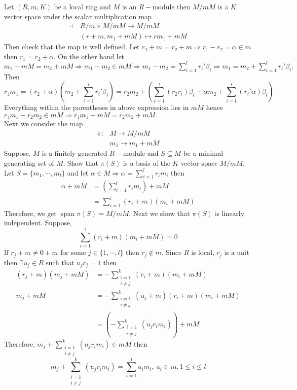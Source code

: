\documentclass[11pt]{amsart}
\begin{document}
Let $(R,m,K)$ be a local ring and $M$ is an $R-$module then $M/mM$ is a $K$ vector space under the scalar multiplication map \begin{align*}
\cdot:&R/m\times M/mM \to M/mM\\
&(r+m,m_1+mM)\mapsto rm_1+mM
\end{align*}
Then check that the map is well defined. Let $r_1+m=r_2+m \Rightarrow r_1-r_2=\alpha \in m$ then $r_1=r_2+\alpha.$ On the other hand let $m_1+mM=m_2+mM \Rightarrow m_1-m_2\in mM \Rightarrow m_1-m_2=\displaystyle\sum_{i=1}^l r_i'\beta_i \Rightarrow m_1=m_2+\displaystyle\sum_{i=1}^l r_i'\beta_i.$ Then $$r_1m_1=(r_2+\alpha)(m_2+\displaystyle\sum_{i=1}^l r_i'\beta_i)=r_2m_2+\left( \displaystyle\sum_{i=1}^l (r_2r_i)\beta_i+\alpha m_2+\displaystyle\sum_{i=1}^l (r_i'\alpha)\beta_i \right)$$ Everything within the parentheses in above expression lies in $mM$ hence $r_1m_1-r_2m_2\in mM \Rightarrow r_1m_1+mM=r_2m_2+mM.$\\
Next we consider the map \begin{align*}
\pi:&M\to M/mM\\
&m_1\to m_1+mM
\end{align*}
Suppose, $M$ is a finitely generated $R-$module and $S\subseteq M$ be a minimal generating set of $M.$ Show that $\pi(S)$ is a basis of the $K$ vector space $M/mM.$ Let $S=\{m_1,\cdots ,m_l\}$ and let $\alpha\in M \Rightarrow \alpha=\displaystyle\sum_{i=1}^l r_im_i$ then \begin{align*}
\alpha+mM&=\left(\displaystyle\sum_{i=1}^l r_im_i \right) +mM\\
&=\displaystyle\sum_{i=1}^l (r_i+m)(m_i+mM)
\end{align*}
Therefore, we get $\operatorname{span}\pi(S)=M/mM.$ Next we show that $\pi(S)$ is linearly independent. Suppose, $$\displaystyle\sum_{i=1}^l (r_i+m)(m_i+mM)=0$$ If $r_j+m\neq 0+m$ for some $j\in \{1,\cdots, l\}$ then $r_j\notin m.$ Since $R$ is local, $r_j$ is a unit then $\exists u_j\in R$ such that $u_jr_j=1$ then \begin{align*}
(r_j+m)(m_j+mM)&=-\displaystyle\sum_{\substack{i=1\\ i\neq j}}^k (r_i+m)(m_i+mM)\\
m_j+mM&=-\displaystyle\sum_{\substack{i=1\\ i\neq j}}^k (u_j+m)(r_i+m)(m_i+mM)\\
&=\left(-\displaystyle\sum_{\substack{i=1\\ i\neq j}}^k (u_jr_im_i)\right)+mM
\end{align*}
Therefore, $m_j+\displaystyle\sum_{\substack{i=1\\ i\neq j}}^k (u_jr_im_i)\in mM$ then \begin{equation} 
 m_j+\displaystyle\sum_{\substack{i=1\\ i\neq j}}^k (u_jr_im_i)=\displaystyle\sum_{i=1}^l a_im_i,~a_i\in m,1\leq i\leq l \end{equation}
\end{document}
